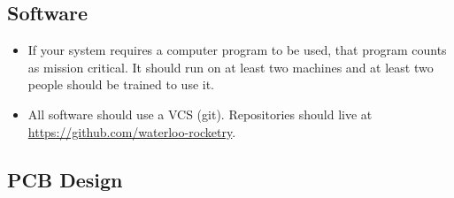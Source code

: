 \documentclass{article}
\begin{document}
\subsection{Software}
\begin{itemize}
\item If your system requires a computer program to be used, that program counts as mission critical. It should run on at least two machines and at least two people should be trained to use it.
\item All software should use a VCS (git). Repositories should live at \url{https://github.com/waterloo-rocketry}.
\end{itemize}

\subsection{PCB Design}
\end{document}
